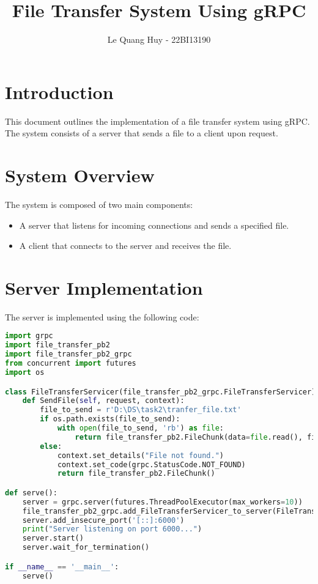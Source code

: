 \documentclass{article}
\title{File Transfer System Using gRPC}
\author{Le Quang Huy - 22BI13190}
\begin{document}
\maketitle

\section{Introduction}
This document outlines the implementation of a file transfer system using gRPC. The system consists of a server that sends a file to a client upon request.

\section{System Overview}
The system is composed of two main components:
\begin{itemize}
    \item A server that listens for incoming connections and sends a specified file.
    \item A client that connects to the server and receives the file.
\end{itemize}

\section{Server Implementation}
The server is implemented using the following code:

\begin{lstlisting}[language=Python, caption=Server Code]
import grpc
import file_transfer_pb2
import file_transfer_pb2_grpc
from concurrent import futures
import os

class FileTransferServicer(file_transfer_pb2_grpc.FileTransferServicer):
    def SendFile(self, request, context):
        file_to_send = r'D:\DS\task2\tranfer_file.txt'
        if os.path.exists(file_to_send):
            with open(file_to_send, 'rb') as file:
                return file_transfer_pb2.FileChunk(data=file.read(), filename='transfer_file.txt')
        else:
            context.set_details("File not found.")
            context.set_code(grpc.StatusCode.NOT_FOUND)
            return file_transfer_pb2.FileChunk()

def serve():
    server = grpc.server(futures.ThreadPoolExecutor(max_workers=10))
    file_transfer_pb2_grpc.add_FileTransferServicer_to_server(FileTransferServicer(), server)
    server.add_insecure_port('[::]:6000')
    print("Server listening on port 6000...")
    server.start()
    server.wait_for_termination()

if __name__ == '__main__':
    serve()
\end{lstlisting}
\end{document}
